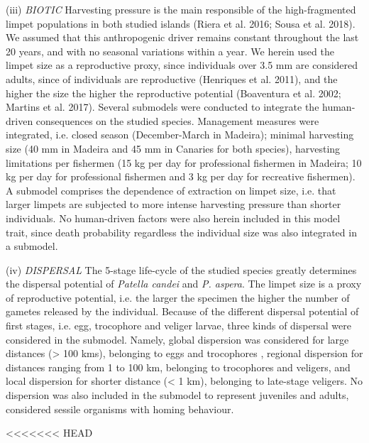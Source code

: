 \documentclass[12pt]{article}
\begin{document}
\begin{flushleft}
(iii) \textit{BIOTIC} Harvesting pressure is the main responsible of
the high-fragmented limpet populations in both studied islands (Riera
et al. 2016; Sousa et al. 2018). We assumed that this anthropogenic
driver remains constant throughout the last 20 years, and with no
seasonal variations within a year. We herein used the limpet size as a
reproductive proxy, since individuals over 3.5 mm are considered
adults, since  of individuals are reproductive (Henriques et
al. 2011), and the higher the size the higher the reproductive
potential (Boaventura et al. 2002; Martins et al. 2017). Several
submodels were conducted to integrate the human-driven consequences on
the studied species. Management measures were integrated, i.e. closed
season (December-March in Madeira); minimal harvesting size (40 mm in
Madeira and 45 mm in Canaries for both species), harvesting
limitations per fishermen (15 kg per day for professional fishermen in
Madeira; 10 kg per day for professional fishermen and 3 kg per day for
recreative fishermen). A submodel comprises the dependence of
extraction on limpet size, i.e. that larger limpets are subjected to
more intense harvesting pressure than shorter individuals.  No
human-driven factors were also herein included in this model trait,
since death probability regardless the individual size was also
integrated in a submodel.

(iv) \textit{DISPERSAL} The 5-stage life-cycle of the studied species
greatly determines the dispersal potential of \textit{Patella candei}
and \textit{P. aspera}. The limpet size is a proxy of reproductive
potential, i.e. the larger the specimen the higher the number of
gametes released by the individual. Because of the different dispersal
potential of first stages, i.e. egg, trocophore and veliger larvae,
three kinds of dispersal were considered in the submodel. Namely,
global dispersion was considered for large distances (> 100 kms),
belonging to eggs and trocophores , regional dispersion for distances
ranging from 1 to 100 km, belonging to trocophores and veligers, and
local dispersion for shorter distance (< 1 km), belonging to
late-stage veligers. No dispersion was also included in the submodel
to represent juveniles and adults, considered sessile organisms with
homing behaviour.

<<<<<<< HEAD

\end{flushleft}
\end{document}
